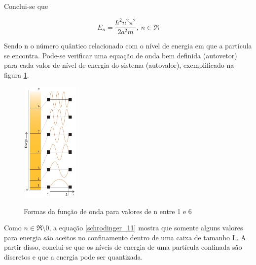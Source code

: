   \par Conclui-se que

  \begin{equation}
    \label{schrodinger_11}
    E_{n} = \frac{\hbar^2 n^2 \pi^2}{2a^2m},\ n\in\Re
  \end{equation}

  \par Sendo n o número quântico relacionado com o nível de energia em que a partícula se encontra. Pode-se verificar uma equação de onda bem definida (autovetor) para cada valor de nível de energia do sistema (autovalor), exemplificado na figura \ref{fig1}\cite{frustrado2}.

    \begin{figure}[H]
      \caption{Formas da função de onda para valores de n entre 1 e 6}
      \centering
      \includegraphics[width=0.25\textwidth]{images/figura1.png}
      \label{fig1}
    \end{figure}

    \par Como $n \in \Re\setminus 0$, a equação \eqref{schrodinger_11} mostra que somente alguns valores para energia são aceitos no confinamento dentro de uma caixa de tamanho L. A partir disso, conclui-se que os níveis de energia de uma partícula confinada são discretos e que a energia pode ser quantizada\cite{frustrado2}.















    